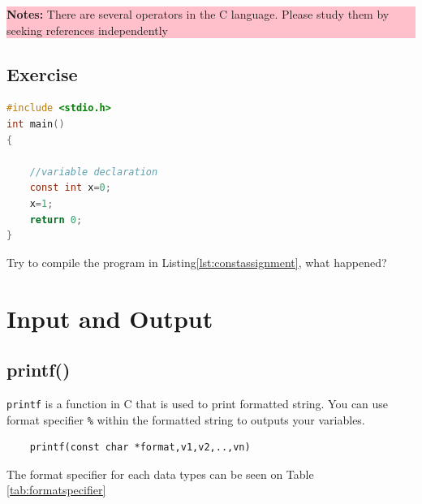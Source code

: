 \begin{center}
	\colorbox{pink}{\parbox{0.8\linewidth}{\textbf{Notes:} There are several operators in the C language. Please study them by seeking references independently}}
\end{center}
\subsection{Exercise}
\begin{lstlisting}[language=c,caption=Using assignment operator in a const variable,label=lst:constassignment,captionpos=t]
#include <stdio.h>
int main()
{

	//variable declaration
    const int x=0;
    x=1;
	return 0;
}
\end{lstlisting} 
Try to compile the program in Listing\ref{lst:constassignment}, what happened?


\section{Input and Output}

\subsection{printf()}
\verb*|printf| is a function in C that is used to print formatted string.  You can use format specifier \verb*|%| within the formatted string to outputs your variables.

\begin{verbatim}
	printf(const char *format,v1,v2,..,vn)
\end{verbatim}

The format specifier for each data types can be seen on Table \ref{tab:formatspecifier}


